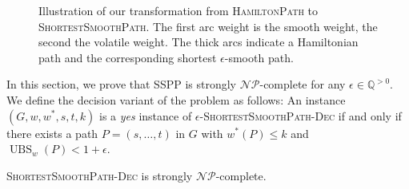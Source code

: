 \documentclass[a4paper,UKenglish,cleveref, autoref, thm-restate]{lipics-v2021}
\newcommand*{\ubs}{\operatorname{UBS}}
\begin{document}
\begin{figure}
\caption{
Illustration of our transformation from \textsc{HamiltonPath} to \textsc{ShortestSmoothPath}.
The first arc weight is the smooth weight, the second the volatile weight.
The thick arcs indicate a Hamiltonian path and the corresponding shortest $\epsilon$-smooth path.
}
\label{fig:transformation}
\end{figure}

In this section, we prove that SSPP is strongly $\mathcal{NP}$-complete for any $\epsilon \in \mathbb{Q}^{>0}$.
We define the decision variant of the problem as follows:
An instance $(G, w, w^*, s, t, k)$ is a \emph{yes} instance of $\epsilon$-\textsc{ShortestSmoothPath-Dec} if and only if there exists a path $P = (s,\dots, t)$ in $G$ with $w^*(P) \leq k$ and $\ubs_w(P) < 1 + \epsilon$.

\begin{theorem}
\textsc{ShortestSmoothPath-Dec} is strongly $\mathcal{NP}$-complete.
\end{theorem}
\end{document}
